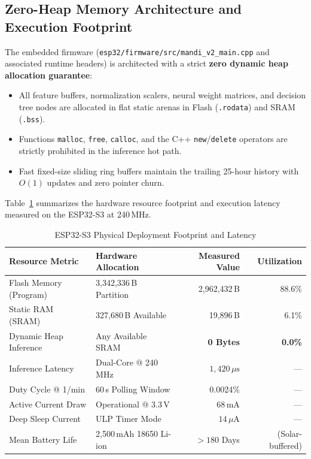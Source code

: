 \documentclass[journal,a4paper]{IEEEtran}
\begin{document}
\subsection{Zero-Heap Memory Architecture and Execution Footprint}

The embedded firmware (\nolinkurl{esp32/firmware/src/mandi_v2_main.cpp} and associated runtime headers) is architected with a strict \textbf{zero dynamic heap allocation guarantee}:
\begin{itemize}
  \item All feature buffers, normalization scalers, neural weight matrices, and decision tree nodes are allocated in flat static arenas in Flash (\texttt{.rodata}) and SRAM (\texttt{.bss}).
  \item Functions \texttt{malloc}, \texttt{free}, \texttt{calloc}, and the C++ \texttt{new}/\texttt{delete} operators are strictly prohibited in the inference hot path.
  \item Fast fixed-size sliding ring buffers maintain the trailing 25-hour history with $O(1)$ updates and zero pointer churn.
\end{itemize}

Table~\ref{tab:esp32_footprint} summarizes the hardware resource footprint and execution latency measured on the ESP32-S3 at 240\,MHz.

\begin{table}[!htbp]
\caption{ESP32-S3 Physical Deployment Footprint and Latency}
\label{tab:esp32_footprint}
\centering
\footnotesize
\setlength{\tabcolsep}{4pt}
\begin{tabular}{@{}llrr@{}}
\toprule
Resource Metric & Hardware Allocation & Measured Value & Utilization \\
\midrule
Flash Memory (Program) & 3{,}342{,}336\,B Partition & 2{,}962{,}432\,B & 88.6\% \\
Static RAM (SRAM)      & 327{,}680\,B Available     & 19{,}896\,B     & 6.1\% \\
Dynamic Heap Inference & Any Available SRAM         & \textbf{0 Bytes}& \textbf{0.0\%} \\
Inference Latency      & Dual-Core @ 240\,MHz        & $1{,}420\,\mu\text{s}$ & --- \\
Duty Cycle @ 1/min     & 60\,s Polling Window       & 0.0024\%        & --- \\
Active Current Draw    & Operational @ 3.3\,V       & 68\,mA          & --- \\
Deep Sleep Current     & ULP Timer Mode             & $14\,\mu\text{A}$& --- \\
Mean Battery Life      & 2{,}500\,mAh 18650 Li-ion  & $> 180$ Days    & (Solar-buffered) \\
\bottomrule
\end{tabular}
\end{table}
\end{document}

